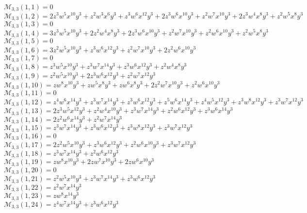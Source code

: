 \scriptsize
$\mathcal{M}_{3,3}(1,1)=0$\\
$\mathcal{M}_{3,3}(1,2)=2z^3w^5x^{10}y^3+z^2w^3x^6y^3+z^3w^6x^{12}y^3+2z^3w^6x^10y^3+z^2w^7x^{10}y^3+2z^3w^4x^8y^3+z^2w^5x^8y^3$\\
$\mathcal{M}_{3,3}(1,3)=0$\\
$\mathcal{M}_{3,3}(1,4)=3z^3w^5x^{10}y^3+2z^2w^4x^8y^3+2z^3w^6x^{10}y^3+z^2w^7x^{10}y^3+z^2w^6x^{10}y^3+z^2w^5x^8y^3$\\
$\mathcal{M}_{3,3}(1,5)=0$\\
$\mathcal{M}_{3,3}(1,6)=3z^2w^5x^{10}y^3+z^3w^6x^12y^3+z^2w^7x^{10}y^3+2z^2w^6x^{10}y^3$\\
$\mathcal{M}_{3,3}(1,7)=0$\\
$\mathcal{M}_{3,3}(1,8)=z^3w^5x^{10}y^3+z^3w^7x^{14}y^3+z^3w^6x^{12}y^3+z^2w^4x^8y^3$\\
$\mathcal{M}_{3,3}(1,9)=z^2w^5x^{10}y^3+2z^3w^6x^{12}y^3+z^2w^7x^{12}y^3$\\
$\mathcal{M}_{3,3}(1,10)=zw^8x^{10}y^3+zw^5x^8y^3+zw^6x^8y^3+2z^2w^7x^{10}y^3+z^2w^6x^{10}y^3$\\
$\mathcal{M}_{3,3}(1,11)=0$\\
$\mathcal{M}_{3,3}(1,12)=z^4w^6x^14y^3+z^3w^7x^{14}y^3+z^3w^6x^{12}y^3+z^5w^6x^{14}y^3+z^4w^5x^{12}y^3+z^3w^8x^{12}y^3+z^3w^7x^{12}y^3$\\
$\mathcal{M}_{3,3}(1,13)=2z^3w^5x^{12}y^3+z^2w^4x^{10}y^3+z^3w^7x^{14}y^3+z^2w^6x^{12}y^3+z^3w^6x^{14}y^3$\\
$\mathcal{M}_{3,3}(1,14)=2z^2w^6x^{14}y^3+z^2w^7x^{14}y^3$\\
$\mathcal{M}_{3,3}(1,15)=z^3w^7x^{14}y^3+z^3w^6x^{12}y^3+z^3w^8x^{12}y^3+z^3w^7x^{12}y^3$\\
$\mathcal{M}_{3,3}(1,16)=0$\\
$\mathcal{M}_{3,3}(1,17)=2z^2w^5x^{10}y^3+z^3w^6x^{12}y^3+z^2w^6x^{10}y^3+z^3w^7x^{12}y^3$\\
$\mathcal{M}_{3,3}(1,18)=z^3w^7x^{14}y^3+z^2w^6x^{12}y^3$\\
$\mathcal{M}_{3,3}(1,19)=zw^8x^{10}y^3+2zw^7x^{10}y^3+2zw^6x^{10}y^3$\\
$\mathcal{M}_{3,3}(1,20)=0$\\
$\mathcal{M}_{3,3}(1,21)=z^2w^5x^{10}y^3+z^3w^7x^{14}y^3+z^3w^6x^{12}y^3$\\
$\mathcal{M}_{3,3}(1,22)=z^2w^7x^{14}y^3$\\
$\mathcal{M}_{3,3}(1,23)=zw^8x^{14}y^3$\\
$\mathcal{M}_{3,3}(1,24)=z^4w^7x^{14}y^3+z^3w^6x^{12}y^3$\\
